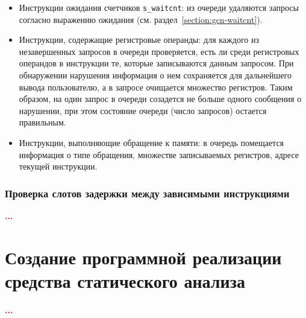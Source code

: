 \documentclass[a4paper,14pt]{extarticle}
\newcommand{\todo}[1]{\textbf{\textcolor{red}{#1}}}
\newenvironment{ul}{\begin{itemize}[noitemsep,topsep=0em]}{\end{itemize}\vspace{20pt}}
\begin{document}
{\begin{ul}
\item Инструкции ожидания счетчиков \texttt{s\_waitcnt}: из очереди удаляются
  запросы согласно выражению ожидания (см. раздел~\ref{section:gcn-waitcnt}).
\item Инструкции, содержащие регистровые операнды: для каждого из незавершенных запросов
  в очереди проверяется, есть ли среди регистровых операндов в инструкции те,
  которые записываются данным запросом. При обнаружении нарушения информация о нем
  сохраняется для дальнейшего вывода пользователю, а в запросе очищается множество
  регистров. Таким образом, на один запрос в очереди созадется не больше одного сообщения
  о нарушении, при этом состояние очереди (число запросов) остается правильным.
\item Инструкции, выполняющие обращение к памяти: в очередь помещается информация о
  типе обращения, множестве записываемых регистров, адресе текущей инструкции.
\end{ul}

\subsubsection{Проверка слотов задержки между зависимыми инструкциями}

\todo{...}

\section{Создание программной реализации средства статического анализа}

\todo{...}

\newpage
{}
{}
\printbibliography[title={СПИСОК ИСТОЧНИКОВ}]
\end{document}
